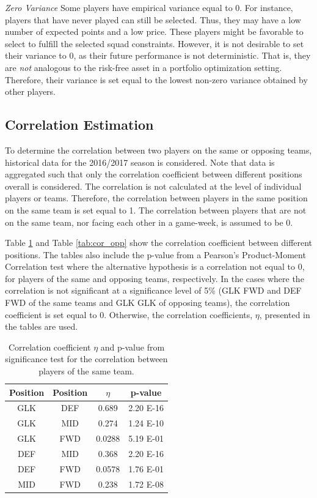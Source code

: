 \newpar

\textit{Zero Variance}
\newline
Some players have empirical variance equal to 0. For instance, players that have never played can still be selected. Thus, they may have a low number of expected points and a low price. These players might be favorable to select to fulfill the selected squad constraints. However, it is not desirable to set their variance to 0, as their future performance is not deterministic. That is, they are \textit{not} analogous to the risk-free asset in a portfolio optimization setting. Therefore, their variance is set equal to the lowest non-zero variance obtained by other players.

\subsection{Correlation Estimation}

To determine the correlation between two players on the same or opposing teams, historical data for the 2016/2017 season is considered. Note that data is aggregated such that only the correlation coefficient between different positions overall is considered. The correlation is not calculated at the level of individual players or teams. Therefore, the correlation between players in the same position on the same team is set equal to 1. The correlation between players that are not on the same team, nor facing each other in a game-week, is assumed to be 0.

\newpar

Table \ref{tab:cor_team} and Table \ref{tab:cor_opp} show the correlation coefficient between different positions. The tables also include the p-value from a Pearson's Product-Moment Correlation test where the alternative hypothesis is a correlation not equal to 0, for players of the same and opposing teams, respectively. In the cases where the correlation is not significant at a significance level of 5\% (GLK FWD and DEF FWD of the same teams and GLK GLK of opposing teams), the correlation coefficient is set equal to 0. Otherwise, the correlation coefficients, $\eta$, presented in the tables are used.

\begin{table}[!htb]
\centering
\begin{tabular}{|c|c|c|c|}
\hline
Position & Position & $\eta$    & p-value  \\
\hline
GLK  \Tstrut     & DEF      & 0.689  & 2.20 E-16 \\
GLK      & MID      & 0.274  & 1.24 E-10 \\
GLK      & FWD      & 0.0288 & 5.19 E-01   \\
DEF      & MID      & 0.368  & 2.20 E-16 \\
DEF      & FWD      & 0.0578 & 1.76 E-01   \\
MID    \Bstrut   & FWD      & 0.238  & 1.72 E-08 \\
\hline
\end{tabular}
\caption{Correlation coefficient $\eta$ and p-value from significance test for the correlation between players of the same team.}
\label{tab:cor_team}
\end{table}

